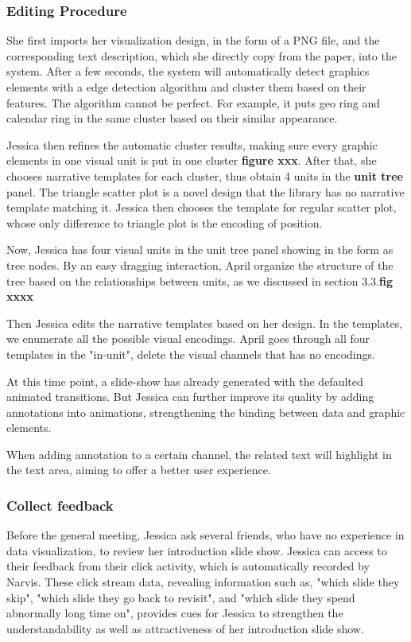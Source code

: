 \documentclass[review,journal]{vgtc}         %
\begin{document}
\subsubsection{Editing Procedure}
She first imports her visualization design, in the form of a PNG file, and the corresponding text description, which she directly copy from the paper, into the system. After a few seconds, the system will automatically detect graphics elements with a edge detection algorithm and cluster them based on their features. The algorithm cannot be perfect. For example, it puts geo ring and calendar ring in the same cluster based on their similar appearance. \par
Jessica then refines the automatic cluster results, making sure every graphic elements in one visual unit is put in one cluster \textbf{figure xxx}. After that, she chooses narrative templates for each cluster, thus obtain 4 units in the \textbf{unit tree} panel. The triangle scatter plot is a novel design that the library has no narrative template matching it. Jessica then chooses the template for regular scatter plot, whose only difference to triangle plot is the encoding of position. \par
Now, Jessica has four visual units in the unit tree panel showing in the form as tree nodes. By an easy dragging interaction, April organize the structure of the tree based on the relationships between units, as we discussed in section 3.3.\textbf{fig xxxx}\par
Then Jessica edits the narrative templates based on her design. In the templates, we enumerate all the possible visual encodings. April goes through all four templates in the "in-unit", delete the visual channels that has no encodings. \par
At this time point, a slide-show has already generated with the defaulted animated transitions. But Jessica can further improve its quality by adding annotations into animations, strengthening the binding between data and graphic elements. \par
When adding annotation to a certain channel, the related text will highlight in the text area, aiming to offer a better user experience. \par  
\subsubsection{Collect feedback}

Before the general meeting, Jessica ask several friends, who have no experience in data visualization, to review her introduction slide show. Jessica can access to their feedback from their click activity, which is automatically recorded by Narvis. These click stream data, revealing information such as, "which slide they skip", "which slide they go back to revisit", and "which slide they spend abnormally long time on", provides cues for Jessica to strengthen the understandability as well as attractiveness of her introduction slide show.  
\end{document}
